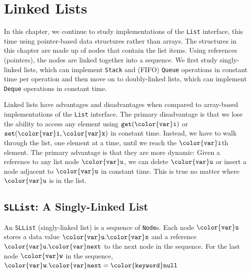 \documentclass[10pt]{book}
\newcommand{\chaplabel}[1]{\label{chap:#1}}
\newcommand{\seclabel}[1]{\label{sec:#1}}
\theoremstyle{plain}
\theoremstyle{definition}
\begin{document}
\clearpage

\clearpage
\chapter{Linked Lists}
\chaplabel{linkedlists}

%
In this chapter, we continue to study implementations of the \texttt{List}
interface, this time using pointer-based data structures rather than
arrays.  The structures in this chapter are made up of nodes that
contain the list items.  Using references (pointers), the nodes are
linked together into a sequence.  We first study singly-linked lists,
which can implement \texttt{Stack} and (FIFO) \texttt{Queue} operations in constant
time per operation and then move on to doubly-linked lists, which can
implement \texttt{Deque} operations in constant time.

Linked lists have advantages and disadvantages when compared to array-based
implementations of the \texttt{List} interface.  The primary disadvantage is that
we lose the ability to access any element using \ensuremath{\mathtt{get({\color{var}i})}} or \ensuremath{\mathtt{set({\color{var}i},{\color{var}x})}}
in constant time.  Instead, we have to walk through the list, one element
at a time, until we reach the \ensuremath{\mathtt{{\color{var}i}}}th element.  The primary advantage is
that they are more dynamic:  Given a reference to any list node \ensuremath{\mathtt{{\color{var}u}}}, we
can delete \ensuremath{\mathtt{{\color{var}u}}} or insert a node adjacent to \ensuremath{\mathtt{{\color{var}u}}} in constant time. This
is true no matter where \ensuremath{\mathtt{{\color{var}u}}} is in the list.


\section{\texttt{SLList}: A Singly-Linked List}
\seclabel{sllist}

%
%
%
An \texttt{SLList} (singly-linked list) is a sequence of \texttt{Node}s.  Each node
\ensuremath{\mathtt{{\color{var}u}}} stores a data value \ensuremath{\mathtt{{\color{var}u}.{\color{var}x}}} and a reference \ensuremath{\mathtt{{\color{var}u}.{\color{var}next}}} to the next node in
the sequence.  For the last node \ensuremath{\mathtt{{\color{var}w}}} in the sequence, $\ensuremath{\mathtt{{\color{var}w}.{\color{var}next}}} = \ensuremath{\mathtt{{\color{keyword}null}}}$
\end{document}
